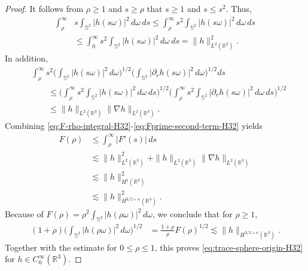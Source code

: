 \documentclass[11pt,twoside]{article}
\theoremstyle{plain}
\theoremstyle{definition}
\theoremstyle{assumption}
\numberwithin{equation}{section}
\begin{document}
\begin{proof}
		
		It follows from  $\rho\ge1$ and  $s\ge\rho$ that $s\ge1$ and $s\le s^2$.
		Thus,
		\begin{equation}\label{eq:Fprime-first-term-H32}
			\begin{aligned}
				\int_\rho^\infty&
				s\int_{\mathbb S^2}|h(s\omega)|^2\,d\omega\,ds
				\le
				\int_\rho^\infty
				s^2\int_{\mathbb S^2}|h(s\omega)|^2\,d\omega\,ds\\
				&\le
				\int_0^\infty
				s^2\int_{\mathbb S^2}|h(s\omega)|^2\,d\omega\,ds=\|h\|_{L^2(\mathbb R^3)}^2.
			\end{aligned}
		\end{equation}
		In addition,
		\begin{equation}\label{eq:Fprime-second-term-H32}
			\begin{aligned}
				&\int_\rho^\infty
				s^2
				\big(
				\int_{\mathbb S^2}|h(s\omega)|^2\,d\omega
				\big)^{1/2}
				\big(
				\int_{\mathbb S^2}|\partial_r h(s\omega)|^2\,d\omega
				\big)^{1/2}
				ds
				\\
				&\qquad\le
				\big(
				\int_\rho^\infty
				s^2\int_{\mathbb S^2}|h(s\omega)|^2\,d\omega\,ds
				\big)^{1/2}
				\big(
				\int_\rho^\infty
				s^2\int_{\mathbb S^2}|\partial_r h(s\omega)|^2\,d\omega\,ds
				\big)^{1/2}
				\\
				&\qquad\le
				\|h\|_{L^2(\mathbb R^3)}
				\|\nabla h\|_{L^2(\mathbb R^3)} .
			\end{aligned}
		\end{equation}
		Combining \eqref{eq:F-rho-integral-H32}-\eqref{eq:Fprime-second-term-H32} yields
		\begin{equation}\label{eq:F-rho-bound-H32}
			\begin{aligned}
				F(\rho)
				&\le
				\int_\rho^\infty |F'(s)|\,ds
				\\
				&\lesssim
				\|h\|_{L^2(\mathbb R^3)}^2
				+
				\|h\|_{L^2(\mathbb R^3)}
				\|\nabla h\|_{L^2(\mathbb R^3)}
				\\
				&\lesssim
				\|h\|_{H^1(\mathbb R^3)}^2
				\\
				&\lesssim
				\|h\|_{H^{3/2+\kappa}(\mathbb R^3)}^2.
			\end{aligned}
		\end{equation}
		Because of $F(\rho)=\rho^2\int_{\mathbb S^2}|h(\rho\omega)|^2\,d\omega$,
		we conclude that for $\rho\ge1$,
		\begin{equation*}
			\begin{aligned}
				(1+\rho)
				\big(
				\int_{\mathbb S^2}|h(\rho\omega)|^2\,d\omega
				\big)^{1/2}
				&=\frac{1+\rho}{\rho}F(\rho)^{1/2}\lesssim
				\|h\|_{H^{3/2+\kappa}(\mathbb R^3)}.
			\end{aligned}
		\end{equation*}
		Together with the estimate for $0\le\rho\le1$, this proves
		\eqref{eq:trace-sphere-origin-H32} for $h\in C_0^\infty(\mathbb R^3)$.
		

\end{proof}
\end{document}
